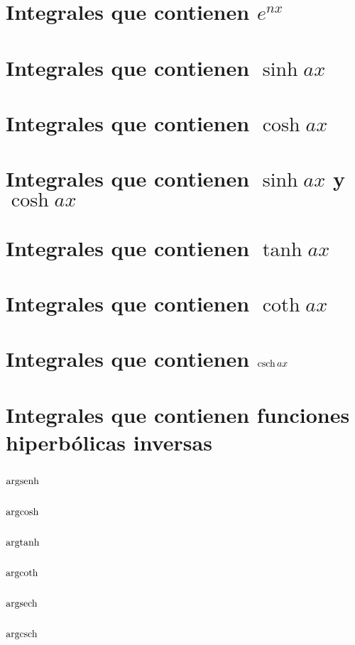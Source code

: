 \section{Integrales que contienen $ e^{nx}$}

\section{Integrales que contienen $\sinh ax$}

\section{Integrales que contienen $\cosh ax$}

\section{Integrales que contienen $\sinh ax$ y $\cosh ax$}

\section{Integrales que contienen $\tanh ax$}

\section{Integrales que contienen $\coth ax$}

\section{Integrales que contienen $\operatorname{csch} ax$}

\section{Integrales que contienen funciones hiperbólicas inversas}
\subsection{$\operatorname{argsenh} $}
\subsection{$\operatorname{argcosh} $}
\subsection{$\operatorname{argtanh} $}
\subsection{$\operatorname{argcoth} $}
\subsection{$\operatorname{argsech} $}
\subsection{$\operatorname{argcsch} $}